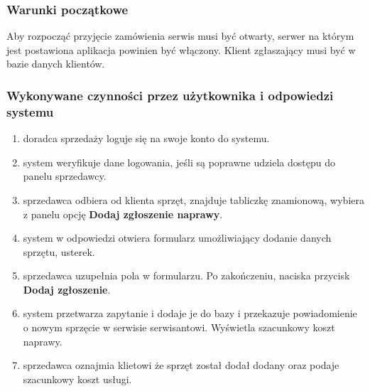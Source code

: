 \documentclass{article}
\begin{document}
\subsubsection{Warunki początkowe}
Aby rozpocząć przyjęcie zamówienia serwis musi być otwarty, serwer na którym jest postawiona aplikacja powinien być włączony.
Klient zgłaszający musi być w bazie danych klientów.
\subsubsection{Wykonywane czynności przez użytkownika i odpowiedzi systemu}
\begin{enumerate}
    \item doradca sprzedaży loguje się na swoje konto do systemu.
    \item system weryfikuje dane logowania, jeśli są poprawne udziela dostępu do panelu sprzedawcy.
    \item sprzedawca odbiera od klienta sprzęt, znajduje tabliczkę znamionową, wybiera z panelu opcję \textbf{Dodaj zgłoszenie naprawy}.
    \item system w odpowiedzi otwiera formularz umożliwiający dodanie danych sprzętu, usterek.
    \item sprzedawca uzupełnia pola w formularzu. Po zakończeniu, naciska przycisk \textbf{Dodaj zgłoszenie}.
    \item system przetwarza zapytanie i dodaje je do bazy i przekazuje powiadomienie o nowym sprzęcie w serwisie serwisantowi. Wyświetla szacunkowy koszt naprawy.
    \item sprzedawca oznajmia klietowi że sprzęt został dodał dodany oraz podaje szacunkowy koszt usługi.
\end{enumerate}
\end{document}
